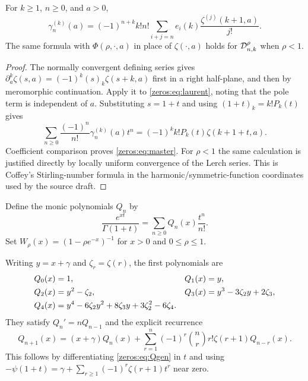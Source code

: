 \begin{proposition}\label{zeros:prop:master}
For $k\geq1$, $n\geq0$, and $a>0$,
\begin{equation}\label{zeros:eq:master}
 \gamma_n^{(k)}(a)=(-1)^{n+k}k!n!
     \sum_{i+j=n}e_i(k)\frac{\zeta^{(j)}(k+1,a)}{j!}.
\end{equation}
The same formula with $\Phi(\rho,\cdot,a)$ in place of $\zeta(\cdot,a)$ holds for $\mathcal D_{n,k}^{\rho}$ when $\rho<1$.
\end{proposition}
\begin{proof}
The normally convergent defining series gives
$\partial_a^k\zeta(s,a)=(-1)^k(s)_k\zeta(s+k,a)$ first in a right half-plane, and then by meromorphic continuation. Apply it to \eqref{zeros:eq:laurent}, noting that the pole term is independent of $a$. Substituting $s=1+t$ and using $(1+t)_k=k!P_k(t)$ gives
\begin{equation}\label{zeros:eq:mastergen}
 \sum_{n\geq0}\frac{(-1)^n}{n!}\gamma_n^{(k)}(a)t^n
     =(-1)^k k!P_k(t)\zeta(k+1+t,a).
\end{equation}
Coefficient comparison proves \eqref{zeros:eq:master}. For $\rho<1$ the same calculation is justified directly by locally uniform convergence of the Lerch series. This is Coffey's Stirling-number formula in the harmonic/symmetric-function coordinates used by the source draft.
\end{proof}

\begin{definition}\label{zeros:def:Q}
Define the monic polynomials $Q_n$ by
\begin{equation}\label{zeros:eq:Qgen}
 \frac{e^{xt}}{\Gamma(1+t)}=\sum_{n\geq0}Q_n(x)\frac{t^n}{n!}.
\end{equation}
Set $W_\rho(x)=(1-\rho e^{-x})^{-1}$ for $x>0$ and $0\leq\rho\leq1$.
\end{definition}

Writing $y=x+\gamma$ and $\zeta_r=\zeta(r)$, the first polynomials are
\begin{align}
 Q_0(x)&=1,& Q_1(x)&=y,\notag\\
 Q_2(x)&=y^2-\zeta_2,& Q_3(x)&=y^3-3\zeta_2y+2\zeta_3,\label{zeros:eq:Qsmall}\\
 Q_4(x)&=y^4-6\zeta_2y^2+8\zeta_3y+3\zeta_2^2-6\zeta_4.\notag
\end{align}
They satisfy $Q_n'=nQ_{n-1}$ and the explicit recurrence
\begin{equation}\label{zeros:eq:Qrec}
 Q_{n+1}(x)=(x+\gamma)Q_n(x)
       +\sum_{r=1}^n(-1)^r\binom nr r!\zeta(r+1)Q_{n-r}(x).
\end{equation}
This follows by differentiating \eqref{zeros:eq:Qgen} in $t$ and using
$-\psi(1+t)=\gamma+\sum_{r\geq1}(-1)^r\zeta(r+1)t^r$ near zero.

